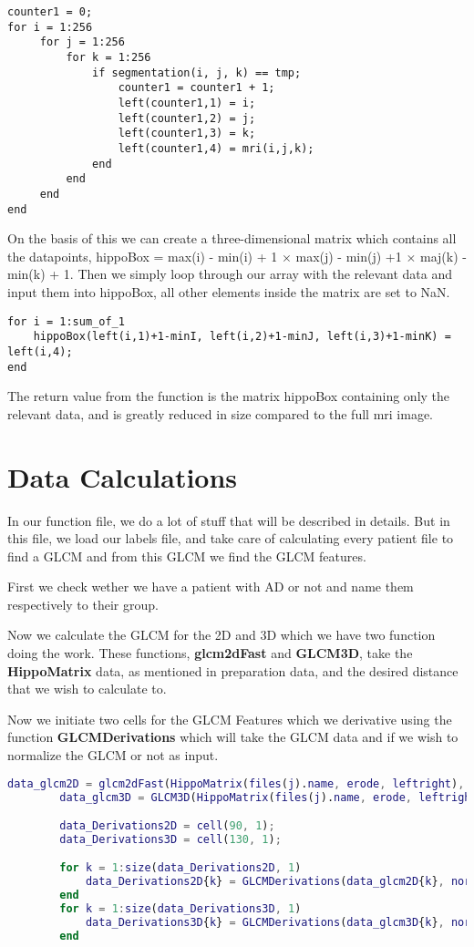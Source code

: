 \begin{lstlisting}
counter1 = 0;
for i = 1:256
     for j = 1:256
         for k = 1:256
             if segmentation(i, j, k) == tmp;
                 counter1 = counter1 + 1;
                 left(counter1,1) = i;
                 left(counter1,2) = j;
                 left(counter1,3) = k;
                 left(counter1,4) = mri(i,j,k);
             end
         end
     end
end
\end{lstlisting}

On the basis of this we can create a three-dimensional matrix which contains all the datapoints, hippoBox = max(i) - min(i) + 1 $\times$ max(j) - min(j) +1 $\times$ maj(k) - min(k) + 1.
Then we simply loop through our array with the relevant data and input them into hippoBox, all other elements inside the matrix are set to NaN.

\begin{lstlisting}
for i = 1:sum_of_1
    hippoBox(left(i,1)+1-minI, left(i,2)+1-minJ, left(i,3)+1-minK) = left(i,4);
end
\end{lstlisting}

The return value from the function is the matrix hippoBox containing only the relevant data, and is greatly reduced in size compared to the full mri image.

\section{Data Calculations}

In our function file, we do a lot of stuff that will be described in details. But in this file, we load our labels file, and take care of calculating every patient file to find a GLCM and from this GLCM we find the GLCM features.

First we check wether we have a patient with AD or not and name them respectively to their group.

Now we calculate the GLCM for the 2D and 3D which we have two function doing the work. These functions, \textbf{glcm2dFast} and \textbf{GLCM3D}, take the \textbf{HippoMatrix} data, as mentioned in preparation data, and the desired distance that we wish to calculate to.

Now we initiate two cells for the GLCM Features which we derivative using the function \textbf{GLCMDerivations} which will take the GLCM data and if we wish to normalize the GLCM or not as input.

\begin{lstlisting}[language=Matlab]
        data_glcm2D = glcm2dFast(HippoMatrix(files(j).name, erode, leftright), 10);
        data_glcm3D = GLCM3D(HippoMatrix(files(j).name, erode, leftright),10);

        data_Derivations2D = cell(90, 1);
        data_Derivations3D = cell(130, 1);

        for k = 1:size(data_Derivations2D, 1)
            data_Derivations2D{k} = GLCMDerivations(data_glcm2D{k}, norm);
        end
        for k = 1:size(data_Derivations3D, 1)
            data_Derivations3D{k} = GLCMDerivations(data_glcm3D{k}, norm);
        end
\end{lstlisting}

